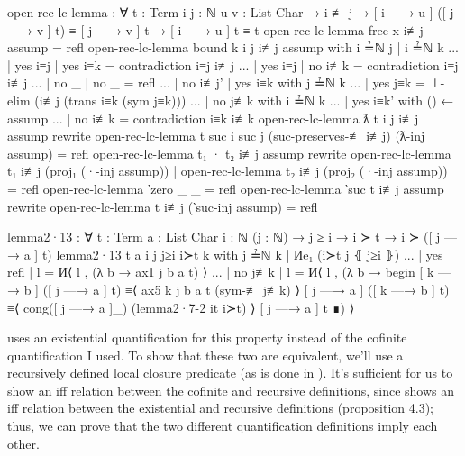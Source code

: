 \begin{code}
  open-rec-lc-lemma : ∀ {t : Term} {i j : ℕ} {u v : List Char}
    → i ≢ j
    → [ i —→ u ] ([ j —→ v ] t) ≡ [ j —→ v ] t
    → [ i —→ u ] t ≡ t
  open-rec-lc-lemma {free x} i≢j assump = refl
  open-rec-lc-lemma {bound k} {i} {j} i≢j assump
    with i ≟ℕ j | i ≟ℕ k
  ... | yes i≡j | yes i≡k = contradiction i≡j i≢j
  ... | yes i≡j | no  i≢k = contradiction i≡j i≢j
  ... | no  _   | no  _   = refl
  ... | no i≢j' | yes i≡k with j ≟ℕ k
  ...   | yes j≡k = ⊥-elim (i≢j (trans i≡k (sym j≡k)))
  ...   | no  j≢k with i ≟ℕ k
  ...     | yes i≡k' with () ← assump
  ...     | no  i≢k  = contradiction i≡k i≢k
  open-rec-lc-lemma {ƛ t} {i} {j} i≢j assump
    rewrite open-rec-lc-lemma {t} {suc i} {suc j}
        (suc-preserves-≢ i≢j)
        (ƛ-inj assump)
      = refl
  open-rec-lc-lemma {t₁ · t₂} i≢j assump
    rewrite
      open-rec-lc-lemma {t₁} i≢j (proj₁ (·-inj assump))
    | open-rec-lc-lemma {t₂} i≢j (proj₂ (·-inj assump))
    = refl
  open-rec-lc-lemma {‵zero} _ _ = refl
  open-rec-lc-lemma {‵suc t} i≢j assump
    rewrite open-rec-lc-lemma {t} i≢j (‵suc-inj assump) = refl

  lemma2·13 : ∀ {t : Term} {a : List Char} {i : ℕ} (j : ℕ)
    → j ≥ i
    → i ≻ t
    → i ≻ ([ j —→ a ] t)
  lemma2·13 {t} {a} {i} j j≥i i≻t k
    with j ≟ℕ k | Иe₁ (i≻t j ⦃ j≥i ⦄)
  ... | yes refl | l = И⟨ l , (λ b → ax1 j b a t) ⟩
  ... | no  j≢k  | l = И⟨ l , (λ b →
    begin
      [ k —→ b ] ([ j —→ a ] t)
    ≡⟨ ax5 k j b a t (sym-≢ j≢k) ⟩
      [ j —→ a ] ([ k —→ b ] t)
    ≡⟨ cong([ j —→ a ]_) (lemma2·7-2 it i≻t) ⟩
      [ j —→ a ] t
    ∎) ⟩
\end{code}

\citet{pitts_locally_2023} uses an existential quantification for this property instead of the
cofinite quantification I used. To show that these two are equivalent, we'll use a recursively
defined local closure predicate (as is done in \citet{chargueraud_locally_2012}). It's sufficient
for us to show an iff relation between the cofinite and recursive definitions, since
\citet{pitts_locally_2023} shows an iff relation between the existential and recursive definitions
(proposition 4.3); thus, we can prove that the two different quantification definitions imply each
other.

